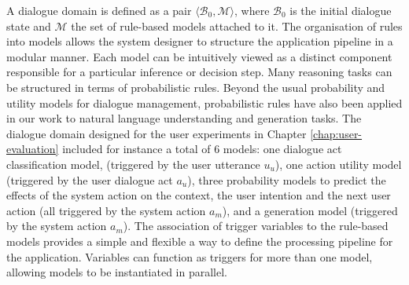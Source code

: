 A dialogue domain is defined as a pair $\langle \mathcal{B}_0, \mathcal{M} \rangle$, where $\mathcal{B}_0$ is the initial dialogue state  and $\mathcal{M}$ the set of rule-based models attached to it. The organisation of rules into models allows the system designer to structure the application pipeline in a modular manner. Each model can be intuitively viewed as a distinct component responsible for a particular inference or decision step. Many reasoning tasks can be structured in terms of probabilistic rules.  Beyond the usual probability and utility models for dialogue management, probabilistic rules have also been applied in our work to natural language understanding and generation tasks.  The dialogue domain designed for the user experiments in Chapter \ref{chap:user-evaluation} included for instance a total of 6 models: one dialogue act classification model, (triggered by the user utterance $u_u$), one action utility model (triggered by the user dialogue act $a_u$), three probability models to predict the effects of the system action on the context, the user intention and the next user action (all triggered by the system action $a_m$), and a generation model (triggered by the system action $a_m$).  The association of trigger variables to the rule-based models provides a simple and flexible a way to define the processing pipeline for the application.  Variables can function as triggers for more than one model, allowing models to be instantiated in parallel.

